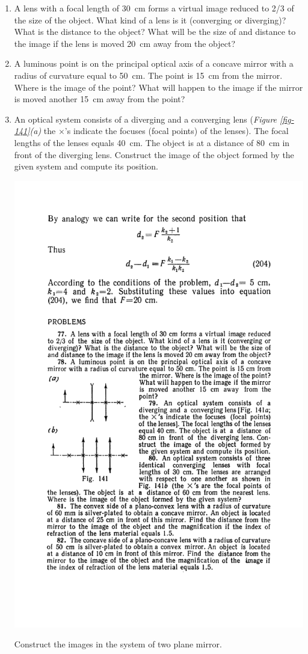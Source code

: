 \documentclass[a4paper,sfsidenotes]{tufte-book}
\begin{document}
\begin{enumerate}[resume=problems]

\item A lens with a focal length of \SI{30}{\centi\metre} forms a virtual image reduced to 2/3 of the size of the object. What kind of a lens is it (converging or diverging)? What is the distance to the object? What will be the size of and distance to the image if the lens is moved \SI{20}{\centi\metre} away from the object? 

\item A luminous point is on the principal optical axis of a concave mirror with a radius of curvature equal to \SI{50}{\centi\metre}. The point is \SI{15}{\centi\metre} from the mirror. Where is the image of the point? What will happen to the image if the mirror is moved another \SI{15}{\centi\metre} away from the point?

\item An optical system consists of a diverging and a converging lens (\emph{Figure \ref{fig-141}(a)} the $\times$'s indicate the focuses (focal points) of the lenses). The focal lengths of the lenses equals \SI{40}{\centi\metre}. The object is at a distance of \SI{80}{\centi\metre} in front of the diverging lens. Construct the image of the object formed by the given system and compute its position.
\begin{marginfigure}%
\includegraphics[width=0.8\linewidth]{fig-141a}
\caption{Construct the images in the system of two plane mirror.}
\label{fig-141}
\end{marginfigure}


\end{enumerate}
\end{document}
